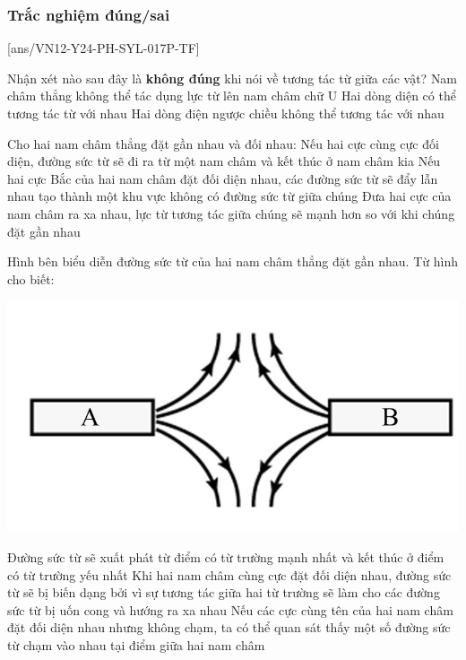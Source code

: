
\subsubsection{Trắc nghiệm đúng/sai}
[ans/VN12-Y24-PH-SYL-017P-TF]
\setcounter{ex}{0}
\begin{ex}
	Nhận xét nào sau đây là \textbf{không đúng} khi nói về tương tác từ giữa các vật?
	{Nam châm thẳng không thể tác dụng lực từ lên nam châm chữ U}
	{\True Hai dòng diện có thể tương tác từ với nhau}
	{Hai dòng điện ngược chiều không thể tương tác với nhau}
	\loigiai{}
\end{ex}

\begin{ex}
	Cho hai nam châm thẳng đặt gần nhau và đối nhau:
	{Nếu hai cực cùng cực đối diện, đường sức từ sẽ đi ra từ một nam châm và kết thúc ở nam châm kia}
	{\True Nếu hai cực Bắc của hai nam châm đặt đối diện nhau, các đường sức từ sẽ đẩy lẫn nhau tạo thành một khu vực không có đường sức từ giữa chúng}
	{Đưa hai cực của nam châm ra xa nhau, lực từ tương tác giữa chúng sẽ mạnh hơn so với khi chúng đặt gần nhau}
	\loigiai{}
\end{ex}
\begin{ex}
	Hình bên biểu diễn đường sức từ của hai nam châm thẳng đặt gần nhau. Từ hình cho biết:
	\begin{center}
		\includegraphics[width=0.35\linewidth]{figs/VN12-Y24-PH-SYL-017P-9}
	\end{center}
	{Đường sức từ sẽ xuất phát từ điểm có từ trường mạnh nhất và kết thúc ở điểm có từ trường yếu nhất}
	{\True Khi hai nam châm cùng cực đặt đối diện nhau, đường sức từ sẽ bị biến dạng bởi vì sự tương tác giữa hai từ trường sẽ làm cho các đường sức từ bị uốn cong và hướng ra xa nhau}
	{Nếu các cực cùng tên của hai nam châm đặt đối diện nhau nhưng không chạm, ta có thể quan sát thấy một số đường sức từ chạm vào nhau tại điểm giữa hai nam châm}
	
\end{ex}
